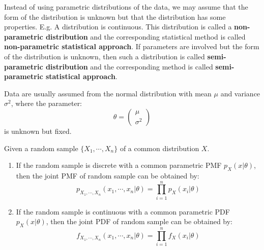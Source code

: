 \documentclass{huhtakm-template-book-v2}
\begin{document}
\begin{rem}
	Instead of using parametric distributions of the data, we may assume that the form of the distribution is unknown but that the distribution has some properties. E.g. A distribution is continuous. This distribution is called a \textbf{non-parametric distribution} and the corresponding statistical method is called \textbf{non-parametric statistical approach}. If parameters are involved but the form of the distribution is unknown, then such a distribution is called \textbf{semi-parametric distribution} and the corresponding method is called \textbf{semi-parametric statistical approach}.
\end{rem}
\begin{eg}
	Data are usually assumed from the normal distribution with mean $\mu$ and variance $\sigma^{2}$, where the parameter:
	\begin{equation*}
		\theta=\begin{pmatrix}
			\mu\\
			\sigma^{2}
		\end{pmatrix}
	\end{equation*}
	is unknown but fixed.
\end{eg}
\begin{lem}
	Given a random sample $\{X_{1},\cdots,X_{n}\}$ of a common distribution $X$.
	\begin{enumerate}
		\item If the random sample is discrete with a common parametric PMF $p_{X}(x|\theta)$, then the joint PMF of random sample can be obtained by:
		\begin{equation*}
			p_{X_{1},\cdots,X_{n}}(x_{1},\cdots,x_{n}|\theta)=\prod_{i=1}^{n}p_{X}(x_{i}|\theta)
		\end{equation*}
		\item If the random sample is continuous with a common parametric PDF $p_{X}(x|\theta)$, then the joint PDF of random sample can be obtained by:
		\begin{equation*}
			f_{X_{1},\cdots,X_{n}}(x_{1},\cdots,x_{n}|\theta)=\prod_{i=1}^{n}f_{X}(x_{i}|\theta)
		\end{equation*}
	\end{enumerate}
\end{lem}
\end{document}
